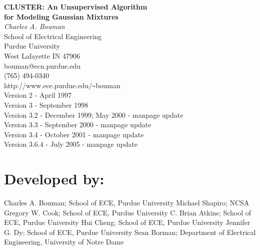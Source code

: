 \documentclass[12pt]{article}
\begin{document}
\graphicspath{{figs/}}

\vspace*{\fill}
\begin{center}
{\Large \bf  
CLUSTER: An Unsupervised Algorithm \\
for Modeling Gaussian Mixtures}\\
\bigskip
{\em Charles A. Bouman}\\
School of Electrical Engineering\\
Purdue University\\
West Lafayette IN 47906\\
bouman@ecn.purdue.edu\\
(765) 494-0340\\
http://www.ece.purdue.edu/\verb|~|bouman\\
Version 2 - April 1997\\
Version 3 - September 1998\\
Version 3.2 - December 1999; May 2000 - manpage update\\
Version 3.3 - September 2000 - manpage update\\
Version 3.4 - October 2001 - manpage update\\
Version 3.6.4 - July 2005 - manpage update\\
\end{center}

\section*{Developed by:}

\hspace*{0.5in}
\parbox{6in}{
\noindent
Charles A. Bouman; School of ECE, Purdue University\newline
Michael Shapiro; NCSA\newline
Gregory W. Cook; School of ECE, Purdue University\newline
C. Brian Atkins; School of ECE, Purdue University\newline
Hui Cheng; School of ECE, Purdue University\newline
Jennifer G. Dy; School of ECE, Purdue University\newline
Sean Borman; Department of Electrical Engineering, University of Notre Dame\newline
}

\vspace*{\fill}
\end{document}
